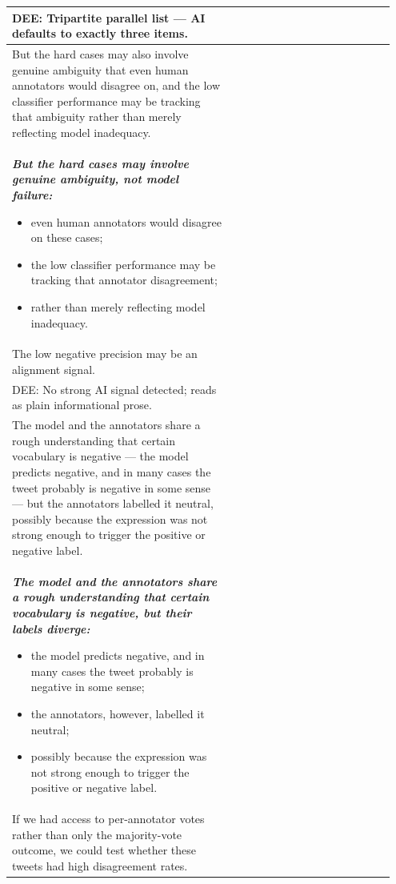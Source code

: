 \documentclass[11pt]{article}
\begin{document}
\begin{longtable}{|p{0.55\linewidth}|p{0.40\linewidth}|}
\hline
DEE: Tripartite parallel list --- AI defaults to exactly three items. & \\
\hline
But the hard cases may also involve genuine ambiguity that even human annotators would disagree on, and the low classifier performance may be tracking that ambiguity rather than merely reflecting model inadequacy. & \\[2pt]
\hline
{\bfseries\itshape But the hard cases may involve genuine ambiguity, not model failure:
\begin{itemize}[leftmargin=*,topsep=2pt,itemsep=1pt,parsep=0pt]
  \item even human annotators would disagree on these cases;
  \item the low classifier performance may be tracking that annotator disagreement;
  \item rather than merely reflecting model inadequacy.
\end{itemize}}\vspace{2em} & \\
\hline
The low negative precision may be an alignment signal. & \\[2pt]
\hline
DEE: No strong AI signal detected; reads as plain informational prose. & \\
\hline
The model and the annotators share a rough understanding that certain vocabulary is negative --- the model predicts negative, and in many cases the tweet probably is negative in some sense --- but the annotators labelled it neutral, possibly because the expression was not strong enough to trigger the positive or negative label. & \\[2pt]
\hline
{\bfseries\itshape The model and the annotators share a rough understanding that certain vocabulary is negative, but their labels diverge:
\begin{itemize}[leftmargin=*,topsep=2pt,itemsep=1pt,parsep=0pt]
  \item the model predicts negative, and in many cases the tweet probably is negative in some sense;
  \item the annotators, however, labelled it neutral;
  \item possibly because the expression was not strong enough to trigger the positive or negative label.
\end{itemize}}\vspace{2em} & \\
\hline
If we had access to per-annotator votes rather than only the majority-vote outcome, we could test whether these tweets had high disagreement rates. & \\[2pt]

\end{longtable}
\end{document}
